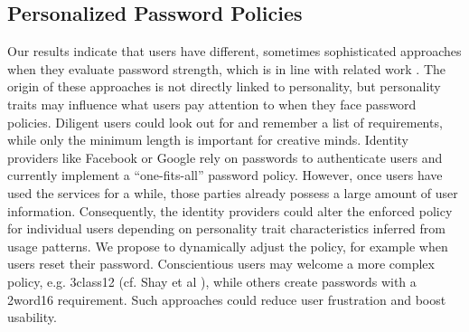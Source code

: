 \subsection{Personalized Password Policies}
Our results indicate that users have different, sometimes sophisticated approaches when they evaluate password strength, which is in line with related work \cite{Ur2016PerceptionsPassword}. The origin of these approaches is not directly linked to personality, but personality traits may influence what users pay attention to when they face password policies. Diligent users could look out for and remember a list of requirements, while only the minimum length is important for creative minds. Identity providers like Facebook or Google rely on passwords to authenticate users and currently implement a ``one-fits-all'' password policy. However, once users have used the services for a while, those parties already possess a large amount of user information. Consequently, the identity providers could alter the enforced policy for individual users depending on personality trait characteristics inferred from usage patterns. We propose to dynamically adjust the policy, for example when users reset their password. Conscientious users may welcome a more complex policy,  e.g. 3class12 (cf. Shay et al \cite{Shay2016DesigningPasswordPolicies}), while others create passwords with a 2word16 requirement. Such approaches could reduce user frustration and boost usability. 

%


